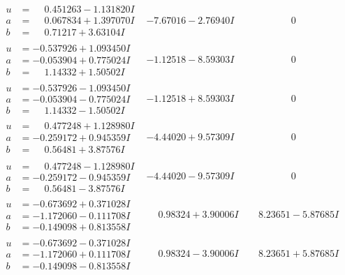 \documentclass[1p]{elsarticle_modified}
\theoremstyle{definition}
\begin{document}
$$\begin{array}{c|c|c}
\begin{aligned}
u &= \phantom{-}0.451263 - 1.131820 I \\
a &= \phantom{-}0.067834 + 1.397070 I \\
b &= \phantom{-}0.71217 + 3.63104 I\end{aligned}
 & -7.67016 - 2.76940 I & \phantom{-0.000000 } 0 \\ \hline\begin{aligned}
u &= -0.537926 + 1.093450 I \\
a &= -0.053904 + 0.775024 I \\
b &= \phantom{-}1.14332 + 1.50502 I\end{aligned}
 & -1.12518 - 8.59303 I & \phantom{-0.000000 } 0 \\ \hline\begin{aligned}
u &= -0.537926 - 1.093450 I \\
a &= -0.053904 - 0.775024 I \\
b &= \phantom{-}1.14332 - 1.50502 I\end{aligned}
 & -1.12518 + 8.59303 I & \phantom{-0.000000 } 0 \\ \hline\begin{aligned}
u &= \phantom{-}0.477248 + 1.128980 I \\
a &= -0.259172 + 0.945359 I \\
b &= \phantom{-}0.56481 + 3.87576 I\end{aligned}
 & -4.44020 + 9.57309 I & \phantom{-0.000000 } 0 \\ \hline\begin{aligned}
u &= \phantom{-}0.477248 - 1.128980 I \\
a &= -0.259172 - 0.945359 I \\
b &= \phantom{-}0.56481 - 3.87576 I\end{aligned}
 & -4.44020 - 9.57309 I & \phantom{-0.000000 } 0 \\ \hline\begin{aligned}
u &= -0.673692 + 0.371028 I \\
a &= -1.172060 - 0.111708 I \\
b &= -0.149098 + 0.813558 I\end{aligned}
 & \phantom{-}0.98324 + 3.90006 I & \phantom{-}8.23651 - 5.87685 I \\ \hline\begin{aligned}
u &= -0.673692 - 0.371028 I \\
a &= -1.172060 + 0.111708 I \\
b &= -0.149098 - 0.813558 I\end{aligned}
 & \phantom{-}0.98324 - 3.90006 I & \phantom{-}8.23651 + 5.87685 I\\

\end{array}$$
\end{document}
